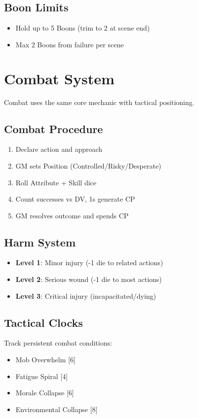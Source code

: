 \documentclass[11pt]{article}
\begin{document}
\subsection{Boon Limits}
\begin{itemize}
    \item Hold up to 5 Boons (trim to 2 at scene end)
    \item Max 2 Boons from failure per scene
\end{itemize}

\section{Combat System}

Combat uses the same core mechanic with tactical positioning.

\subsection{Combat Procedure}
\begin{enumerate}
    \item Declare action and approach
    \item GM sets Position (Controlled/Risky/Desperate)
    \item Roll Attribute + Skill dice
    \item Count successes vs DV, 1s generate CP
    \item GM resolves outcome and spends CP
\end{enumerate}

\subsection{Harm System}
\begin{itemize}
    \item \textbf{Level 1}: Minor injury (-1 die to related actions)
    \item \textbf{Level 2}: Serious wound (-1 die to most actions)
    \item \textbf{Level 3}: Critical injury (incapacitated/dying)
\end{itemize}

\subsection{Tactical Clocks}
Track persistent combat conditions:
\begin{itemize}
    \item Mob Overwhelm [6]
    \item Fatigue Spiral [4] 
    \item Morale Collapse [6]
    \item Environmental Collapse [8]
\end{itemize}
\end{document}
